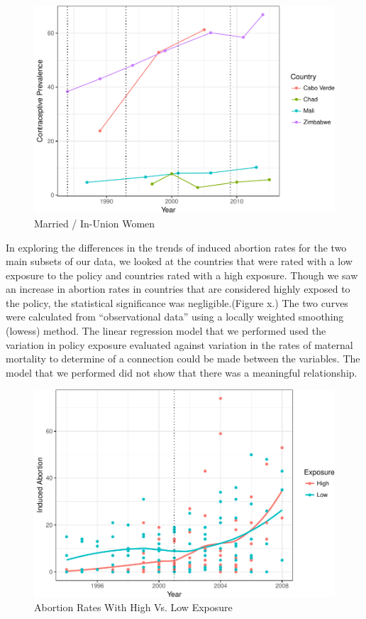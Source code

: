 \documentclass[11pt,]{article}
\makeatletter
\def\maxwidth{\ifdim\Gin@nat@width>\linewidth\linewidth
\else\Gin@nat@width\fi}
\let\Oldincludegraphics\includegraphics
\renewcommand{\includegraphics}[1]{\Oldincludegraphics[width=\maxwidth]{#1}}
\makeatother
\begin{document}
\begin{figure}
\centering
\includegraphics{final-paper_files/figure-latex/unnamed-chunk-1-1.pdf}
\caption{Married / In-Union Women}
\end{figure}

In exploring the differences in the trends of induced abortion rates for
the two main subsets of our data, we looked at the countries that were
rated with a low exposure to the policy and countries rated with a high
exposure. Though we saw an increase in abortion rates in countries that
are considered highly exposed to the policy, the statistical
significance was negligible.(Figure x.) The two curves were calculated
from ``observational data'' using a locally weighted smoothing (lowess)
method. The linear regression model that we performed used the variation
in policy exposure evaluated against variation in the rates of maternal
mortality to determine of a connection could be made between the
variables. The model that we performed did not show that there was a
meaningful relationship.

\begin{figure}
\centering
\includegraphics{final-paper_files/figure-latex/unnamed-chunk-2-1.pdf}
\caption{Abortion Rates With High Vs. Low Exposure}
\end{figure}
\end{document}
